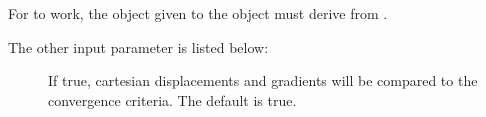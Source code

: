 For  to work, the  object
given to the  object must derive from
.

The other input parameter is listed below:
\begin{description}
  \item[] If true, cartesian displacements and gradients
    will be compared to the convergence criteria.  The default is true.

\end{description}
